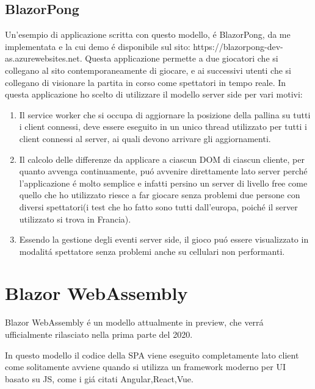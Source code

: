 \subsection{BlazorPong }\label{sez:bpong}
Un'esempio di applicazione scritta con questo modello, \'e BlazorPong\cite{blazorPong}, da me implementata e la cui demo \'e disponibile sul sito: https://blazorpong-dev-as.azurewebsites.net.
Questa applicazione permette a due giocatori che si collegano al sito contemporaneamente di giocare, e ai successivi utenti che si collegano di visionare la partita in corso come spettatori in tempo reale.
In questa applicazione ho scelto di utilizzare il modello server side per vari motivi:
\begin{enumerate}
	\item Il service worker che si occupa di aggiornare la posizione della pallina su tutti i client connessi, deve essere eseguito in un unico thread utilizzato per tutti i client connessi al server, ai quali devono arrivare gli aggiornamenti.
	\item Il calcolo delle differenze da applicare a ciascun DOM di ciascun cliente, per quanto avvenga continuamente, pu\'o avvenire direttamente lato server perch\'e l'applicazione \'e molto semplice e infatti persino un server di livello free come quello che ho utilizzato riesce a far giocare senza problemi due persone con diversi spettatori(i test che ho fatto sono tutti dall'europa, poich\'e il server utilizzato si trova in Francia).
	\item Essendo la gestione degli eventi server side, il gioco pu\'o essere visualizzato in modalit\'a spettatore senza problemi anche su cellulari non performanti.
	
\end{enumerate}

\pagebreak

\section{Blazor WebAssembly}\label{sez:bwa}
Blazor WebAssembly \'e un modello attualmente in preview, che verr\'a ufficialmente rilasciato nella prima parte del 2020.

In questo modello il codice della SPA viene eseguito completamente lato client come solitamente avviene quando si utilizza un framework moderno per UI basato su JS, come i gi\'a citati Angular,React,Vue.

